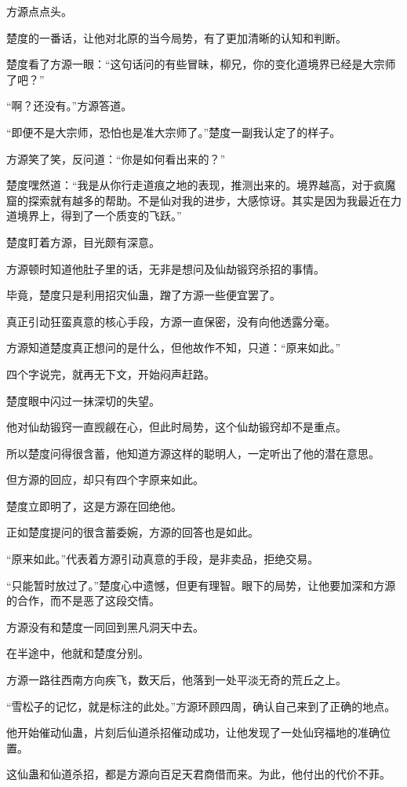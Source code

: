 \begin{this_body}
方源点点头。

楚度的一番话，让他对北原的当今局势，有了更加清晰的认知和判断。

楚度看了方源一眼：“这句话问的有些冒昧，柳兄，你的变化道境界已经是大宗师了吧？”

“啊？还没有。”方源答道。

“即便不是大宗师，恐怕也是准大宗师了。”楚度一副我认定了的样子。

方源笑了笑，反问道：“你是如何看出来的？”

楚度嘿然道：“我是从你行走道痕之地的表现，推测出来的。境界越高，对于疯魔窟的探索就有越多的帮助。不是仙对我的进步，大感惊讶。其实是因为我最近在力道境界上，得到了一个质变的飞跃。”

楚度盯着方源，目光颇有深意。

方源顿时知道他肚子里的话，无非是想问及仙劫锻窍杀招的事情。

毕竟，楚度只是利用招灾仙蛊，蹭了方源一些便宜罢了。

真正引动狂蛮真意的核心手段，方源一直保密，没有向他透露分毫。

方源知道楚度真正想问的是什么，但他故作不知，只道：“原来如此。”

四个字说完，就再无下文，开始闷声赶路。

楚度眼中闪过一抹深切的失望。

他对仙劫锻窍一直觊觎在心，但此时局势，这个仙劫锻窍却不是重点。

所以楚度问得很含蓄，他知道方源这样的聪明人，一定听出了他的潜在意思。

但方源的回应，却只有四个字原来如此。

楚度立即明了，这是方源在回绝他。

正如楚度提问的很含蓄委婉，方源的回答也是如此。

“原来如此。”代表着方源引动真意的手段，是非卖品，拒绝交易。

“只能暂时放过了。”楚度心中遗憾，但更有理智。眼下的局势，让他要加深和方源的合作，而不是恶了这段交情。

方源没有和楚度一同回到黑凡洞天中去。

在半途中，他就和楚度分别。

方源一路往西南方向疾飞，数天后，他落到一处平淡无奇的荒丘之上。

“雪松子的记忆，就是标注的此处。”方源环顾四周，确认自己来到了正确的地点。

他开始催动仙蛊，片刻后仙道杀招催动成功，让他发现了一处仙窍福地的准确位置。

这仙蛊和仙道杀招，都是方源向百足天君商借而来。为此，他付出的代价不菲。


\end{this_body}
